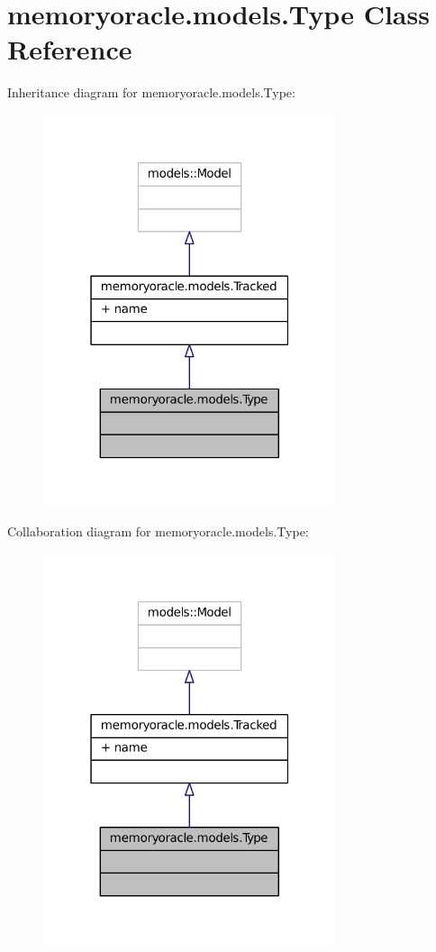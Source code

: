 \hypertarget{classmemoryoracle_1_1models_1_1Type}{}\section{memoryoracle.\+models.\+Type Class Reference}
\label{classmemoryoracle_1_1models_1_1Type}


Inheritance diagram for memoryoracle.\+models.\+Type\+:\nopagebreak
\begin{figure}[H]
\begin{center}
\leavevmode
\includegraphics[width=244pt]{classmemoryoracle_1_1models_1_1Type__inherit__graph}
\end{center}
\end{figure}


Collaboration diagram for memoryoracle.\+models.\+Type\+:\nopagebreak
\begin{figure}[H]
\begin{center}
\leavevmode
\includegraphics[width=244pt]{classmemoryoracle_1_1models_1_1Type__coll__graph}
\end{center}
\end{figure}

